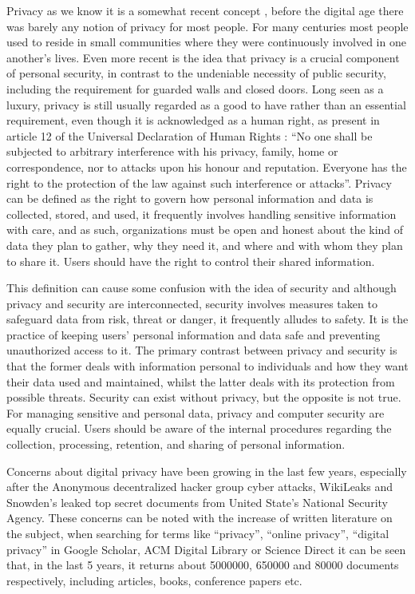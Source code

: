 \documentclass[conference]{IEEEtran}
\begin{document}
Privacy as we know it is a somewhat recent concept \cite{vincent2016privacy, moore2017privacy},
before the digital age there was barely any notion of privacy for most
people. For many centuries most people used to reside in small communities
where they were continuously involved in one another's lives. Even more
recent is the idea that privacy is a crucial component of personal security,
in contrast to the undeniable necessity of public security, including the
requirement for guarded walls and closed doors. Long seen as a luxury, privacy
is still usually regarded as a good to have rather than an essential
requirement, even though it is acknowledged as a human right, as present
in article 12 of the Universal Declaration of Human Rights \cite{RooseveltUniversal}:
``No one shall be subjected to arbitrary interference with his privacy,
family, home or correspondence, nor to attacks upon his honour and reputation.
Everyone has the right to the protection of the law against such interference
or attacks''. Privacy can be defined \cite{InternationalWhat, SpiekermannEngineering}
as the right to govern how personal information and data is collected, stored,
and used, it frequently involves handling sensitive information with care,
and as such, organizations must be open and honest about the kind of data
they plan to gather, why they need it, and where and with whom they plan
to share it. Users should have the right to control their shared information.

This definition can cause some confusion with the idea of security \cite{HIVDifference}
and although privacy and security are interconnected, security involves
measures taken to safeguard data from risk, threat or danger, it frequently
alludes to safety. It is the practice of keeping users' personal information
and data safe and preventing unauthorized access to it. The primary contrast
between privacy and security is that the former deals with information personal
to individuals and how they want their data used and maintained, whilst
the latter deals with its protection from possible threats. Security can
exist without privacy, but the opposite is not true. For managing sensitive
and personal data, privacy and computer security are equally crucial. Users
should be aware of the internal procedures regarding the collection, processing,
retention, and sharing of personal information.

Concerns about digital privacy have been growing \cite{emami2019exploring, park2022personal, zhang2022peer}
in the last few years, especially after the Anonymous decentralized hacker
group cyber attacks, WikiLeaks and Snowden's leaked top secret documents
from United State's National Security Agency. These concerns can be noted
with the increase of written literature on the subject, when searching for
terms like ``privacy'', ``online privacy'', ``digital privacy'' in Google
Scholar, ACM Digital Library or Science Direct it can be seen that, in the
last 5 years, it returns about 5000000, 650000 and 80000 documents respectively,
including articles, books, conference papers etc.
\end{document}
